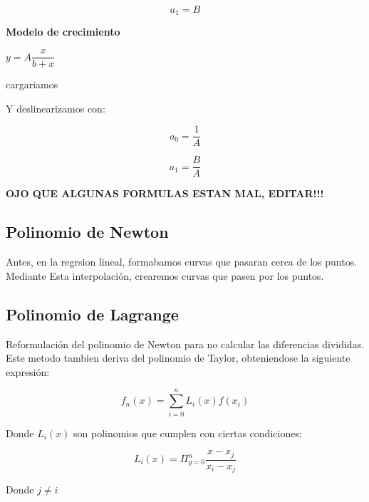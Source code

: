 \documentclass[10pt]{article}
\begin{document}
\begin{equation}
	a_1 = B
\end{equation}

\textbf{Modelo de crecimiento}

$y = A \dfrac{x}{b+x}$

cargariamos

Y deslinearizamos con:

\begin{equation}
	a_0 = \dfrac{1}{A}
\end{equation}

\begin{equation}
	a_1 = \dfrac{B}{A}
\end{equation}

\textbf{OJO QUE ALGUNAS FORMULAS ESTAN MAL, EDITAR!!!}

\subsection{Polinomio de Newton}

Antes, en la regrsion lineal, formabamos curvas que pasaran cerca de los puntos. Mediante Esta
interpolación, crearemos curvas que pasen por los puntos.

\subsection{Polinomio de Lagrange}

Reformulación del polinomio de Newton para no calcular 
las diferencias divididas. Este metodo tambien deriva del polinomio de Taylor,
obteniendose la siguiente expresión:

\begin{equation}
	f_n(x) = \sum_{i=0}^n L_i(x)f(x_i)
\end{equation}

Donde $L_i(x)$ son polinomios que cumplen con ciertas condiciones:

\begin{equation}
	L_i(x) = \Pi_{g=0}^n \dfrac{x-x_j}{x_i-x_j}
\end{equation}

Donde $j \neq i$
\end{document}
